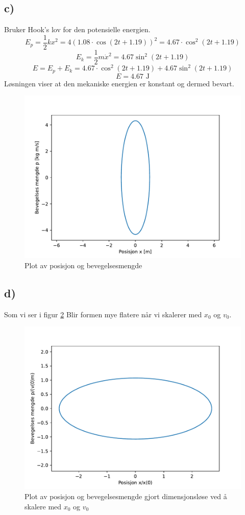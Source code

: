 \documentclass{article}
\begin{document}
\subsection*{c)}
Bruker Hook's lov for den potensielle energien. 
\[
E_p = \frac{1}{2}kx^{2} = 4 \left( 1.08 ⋅ \cos (2t + 1.19) \right) ^{2} = 4.67 ⋅ \cos ^{2}(2t + 1.19)
\]
\[
E_k = \frac{1}{2}m \dot{x}^{2} = 4.67 \sin ^{2} (2t + 1.19)
\]
\[
E = E_p + E_k = 4.67 ⋅ \cos ^{2}(2t + 1.19) + 4.67 \sin ^{2} (2t + 1.19)
\]
\[
E = 4.67 \text{ J}
\]
Løsningen viser at den mekaniske energien er konstant og dermed bevart. 

\newpage
\begin{figure}[h!]
  \centering
  \includegraphics[scale = .5]{Figures/2_c.pdf}
  \caption{Plot av posisjon og bevegelsesmengde}
  \label{fig: 2c}
\end{figure}

\subsection*{d)}
Som vi ser i figur \ref{fig: 2d} Blir formen mye flatere når vi skalerer med $x_0$ og $v_0$. 
\begin{figure}[h!]
  \centering
  \includegraphics[scale = .5]{Figures/2_d.pdf}
  \caption{Plot av posisjon og bevegelsesmengde gjort dimensjonsløse ved å skalere med $x_0$ og $v_0$}
  \label{fig: 2d}
\end{figure}
\end{document}
